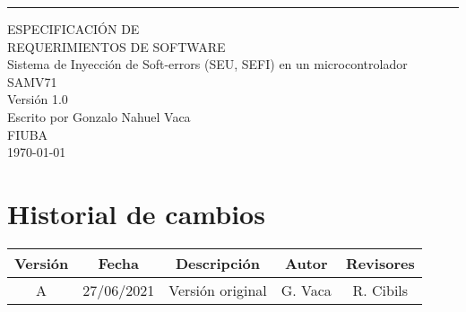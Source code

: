 \documentclass{scrreprt}
\date{26/06/2021}
\def\myversion{1.0 }
\begin{document}
\begin{flushright}
    \rule{16cm}{5pt}\vskip1cm
    \begin{bfseries}
        \Huge{ESPECIFICACIÓN DE\\ REQUERIMIENTOS DE SOFTWARE}\\
        \vspace{1.9cm}
        Sistema de Inyección de Soft-errors (SEU,
        SEFI) en un microcontrolador SAMV71
        \\
        \vspace{1.9cm}
        \LARGE{Versión \myversion}\\
        \vspace{1.9cm}
        Escrito por Gonzalo Nahuel Vaca\\
        \vspace{1.9cm}
        FIUBA\\
        \vspace{1.9cm}
        \today\\
    \end{bfseries}
\end{flushright}

\thispagestyle{empty}

\clearpage
{} 
\chapter*{Historial de cambios}

\begin{center}
    \begin{tabular}{|c|c|c|c|c|}
        \hline
	    Versión & Fecha & Descripción & Autor & Revisores\\
        \hline
	    A & 27/06/2021 & Versión original & G. Vaca & R. Cibils\\
        \hline
    \end{tabular}
\end{center}

\tableofcontents








\end{document}

